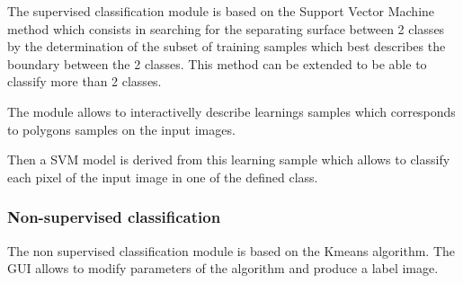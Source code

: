 The supervised classification module is based on the Support Vector
Machine method which consists in searching for the separating surface
between 2 classes by the determination of the subset of training
samples which best describes the boundary between the 2 classes. This
method can be extended to be able to classify more than 2 classes.

The module allows to interactivelly describe learnings samples which
corresponds to polygons samples on the input images.

Then a SVM model is derived from this learning sample which allows to
classify each pixel of the input image in one of the defined class.


\subsubsection{Non-supervised classification}
The non supervised classification module is based on the Kmeans
algorithm.  The GUI allows to modify parameters of the algorithm and
produce a label image.
